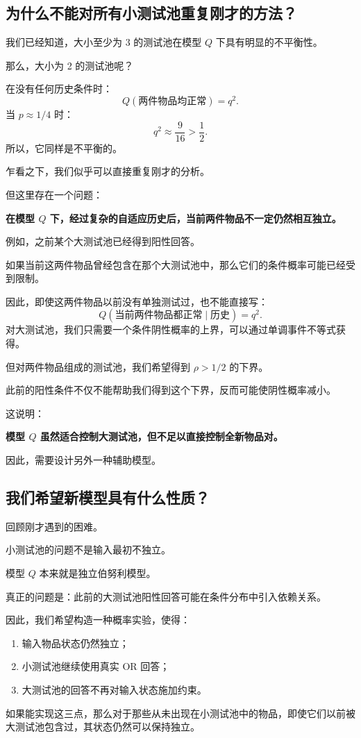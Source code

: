 \documentclass[UTF8,11pt]{ctexart}
\begin{document}
\subsection{为什么不能对所有小测试池重复刚才的方法？}
我们已经知道，大小至少为 3 的测试池在模型 $Q$ 下具有明显的不平衡性。

那么，大小为 2 的测试池呢？

在没有任何历史条件时：
\[Q(\text{两件物品均正常})=q^2.\]
当 $p\approx1/4$ 时：
\[q^2\approx\frac9{16}>\frac12.\]
所以，它同样是不平衡的。

乍看之下，我们似乎可以直接重复刚才的分析。

但这里存在一个问题：

\textbf{在模型 $Q$ 下，经过复杂的自适应历史后，当前两件物品不一定仍然相互独立。}

例如，之前某个大测试池已经得到阳性回答。

如果当前这两件物品曾经包含在那个大测试池中，那么它们的条件概率可能已经受到限制。

因此，即使这两件物品以前没有单独测试过，也不能直接写：
\[Q(\text{当前两件物品都正常}\mid\text{历史})=q^2.\]
对大测试池，我们只需要一个条件阴性概率的上界，可以通过单调事件不等式获得。

但对两件物品组成的测试池，我们希望得到 $\rho>1/2$ 的下界。

此前的阳性条件不仅不能帮助我们得到这个下界，反而可能使阴性概率减小。

这说明：

\textbf{模型 $Q$ 虽然适合控制大测试池，但不足以直接控制全新物品对。}

因此，需要设计另外一种辅助模型。

\subsection{我们希望新模型具有什么性质？}
回顾刚才遇到的困难。

小测试池的问题不是输入最初不独立。

模型 $Q$ 本来就是独立伯努利模型。

真正的问题是：此前的大测试池阳性回答可能在条件分布中引入依赖关系。

因此，我们希望构造一种概率实验，使得：
\begin{enumerate}
\item 输入物品状态仍然独立；
\item 小测试池继续使用真实 OR 回答；
\item 大测试池的回答不再对输入状态施加约束。
\end{enumerate}
如果能实现这三点，那么对于那些从未出现在小测试池中的物品，即使它们以前被大测试池包含过，其状态仍然可以保持独立。
\end{document}
